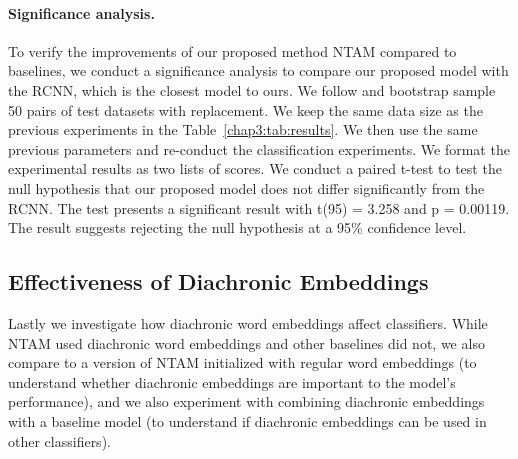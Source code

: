 \paragraph{Significance analysis.} To verify the improvements of our proposed method NTAM compared to baselines, we conduct a significance analysis to compare our proposed model with the RCNN, which is the closest model to ours. We follow \cite{berg2012empirical} and bootstrap sample 50 pairs of test datasets with replacement. We keep the same data size as the previous experiments in the Table~\ref{chap3:tab:results}. We then use the same previous parameters and re-conduct the classification experiments. We format the experimental results as two lists of scores. We conduct a paired t-test to test the null hypothesis that our proposed model does not differ significantly from the RCNN. The test presents a significant result with t(95) = 3.258 and p = 0.00119. The result suggests rejecting the null hypothesis at a 95\% confidence level.



\subsection{Effectiveness of Diachronic Embeddings}

Lastly we investigate how diachronic word embeddings affect classifiers.
While NTAM used diachronic word embeddings and other baselines did not,
we also compare to a version of NTAM initialized with regular word embeddings (to understand whether diachronic embeddings are important to the model's performance),
and we also experiment with combining diachronic embeddings with a baseline model (to understand if diachronic embeddings can be used in other classifiers).


